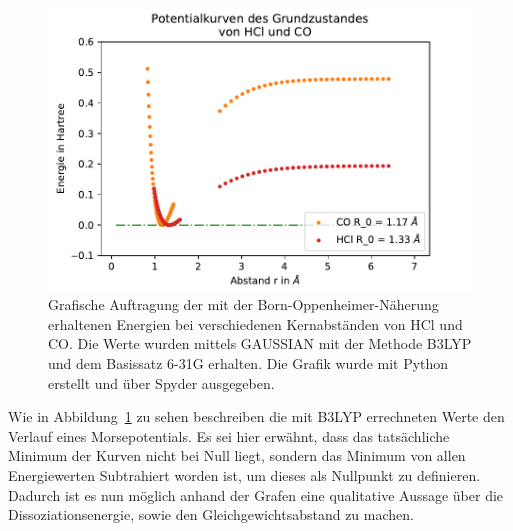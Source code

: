 \begin{figure}[ht]
	\centering	
	\begin{minipage}{0.5\textwidth}
	\includegraphics[width=\columnwidth]{Bilder/b3lypzusammen}
	\end{minipage}
	
	
	\caption{Grafische Auftragung der mit der Born-Oppenheimer-Näherung erhaltenen Energien bei verschiedenen Kernabständen von HCl und CO. Die Werte wurden mittels GAUSSIAN mit der Methode B3LYP und dem Basissatz 6-31G erhalten. Die Grafik wurde mit Python erstellt und über Spyder ausgegeben.}
	
	
	\label{b3lypzusammen}
\end{figure}


Wie in Abbildung~\ref{b3lypzusammen} zu sehen beschreiben die mit B3LYP errechneten Werte den Verlauf eines Morsepotentials. Es sei hier erwähnt, dass das tatsächliche Minimum der Kurven nicht bei Null liegt, sondern das Minimum von allen Energiewerten Subtrahiert worden ist, um dieses als Nullpunkt zu definieren. Dadurch ist es nun möglich anhand der Grafen eine qualitative Aussage über die Dissoziationsenergie, sowie den Gleichgewichtsabstand zu machen.


  

